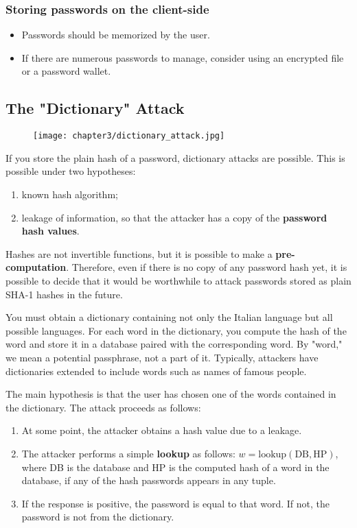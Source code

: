 \subsubsection*{Storing passwords on the client-side}
\begin{itemize}
  \item Passwords should be memorized by the user.
  \item If there are numerous passwords to manage, consider using an encrypted file or a password wallet.
\end{itemize}



\subsection{The "Dictionary" Attack}
\begin{figure}[h]
  \centering
  \texttt{[image: chapter3/dictionary\_attack.jpg]}
\end{figure}

If you store the plain hash of a password, dictionary attacks are possible. This is possible under two hypotheses:
\begin{enumerate}
  \item known hash algorithm;
  \item leakage of information, so that the attacker has a copy of the \textbf{password hash values}.
\end{enumerate}
Hashes are not invertible functions, but it is possible to make a \textbf{pre-computation}. Therefore, even if there is no copy of any password hash yet, it is possible to decide that it would be worthwhile to attack passwords stored as plain SHA-1 hashes in the future.

You must obtain a dictionary containing not only the Italian language but all possible languages.
For each word in the dictionary, you compute the hash of the word and store it in a database paired with the corresponding word.
By "word," we mean a potential passphrase, not a part of it.
Typically, attackers have dictionaries extended to include words such as names of famous people.


The main hypothesis is that the user has chosen one of the words contained in the dictionary. The attack proceeds as follows:
\begin{enumerate}
  \item At some point, the attacker obtains a hash value due to a leakage.
  \item The attacker performs a simple \textbf{lookup} as follows:
        \( w = \mathrm{lookup}(\mathrm{DB}, \mathrm{HP}) \),
        where DB is the database
        and HP is the computed hash of a word in the database, if any of the hash passwords appears in any tuple.
  \item If the response is positive, the password is equal to that word. If not, the password is not from the dictionary.
\end{enumerate}

